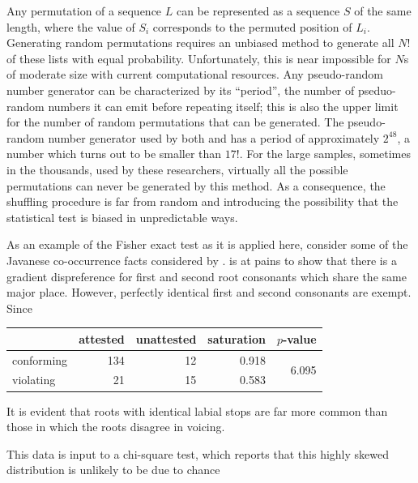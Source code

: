 Any permutation of a sequence $L$ can be represented as a sequence $S$ of the same length, where the value of $S_i$ corresponds to the permuted position of $L_i$. Generating random permutations requires an unbiased method to generate all $N!$ of these lists with equal probability. Unfortunately, this is near impossible for $N$s of moderate size with current computational resources. Any pseudo-random number generator can be characterized by its ``period'', the number of pseduo-random numbers it can emit before repeating itself; this is also the upper limit for the number of random permutations that can be generated. The pseudo-random number generator used by both \citeauthor{Martin2011} and \citeauthor{Brown2010} has a period of approximately $2^{48}$, a number which turns out to be smaller than $17!$. For the large samples, sometimes in the thousands, used by these researchers, virtually all the possible permutations can never be generated by this method. As a consequence, the shuffling procedure is far from random and introducing the possibility that the statistical test is biased in unpredictable ways.

As an example of the Fisher exact test as it is applied here, consider some of the Javanese co-occurrence facts considered by \citet{Mester1988}. \citeauthor{Mester1988} is at pains to show that there is a gradient dispreference for first and second root consonants which share the same major place. However, perfectly identical first and second consonants are exempt. Since 



\begin{example}[Javanese root co-occurrence] %
\begin{tabular}{l r r r r}
\toprule
           & attested & unattested & saturation & $p$-value \\
\midrule
conforming & 134      & 12         & 0.918      & \multirow{2}{*}{6.095\e{-06}} \\
violating  & 21       & 15         & 0.583 \\
\bottomrule
\end{tabular}
\end{example}

\noindent
It is evident that roots with identical labial stops are far more common than those in which the roots disagree in voicing. 

This data is input to a chi-square test, which reports that this highly skewed distribution is unlikely to be due to chance 

